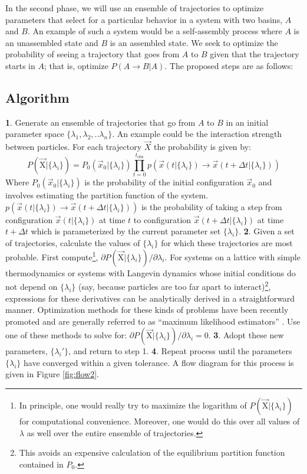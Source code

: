 \documentclass[11pt]{article}
\begin{document}
In the second phase, we will use an ensemble of trajectories to optimize parameters that select for a particular behavior in a system with two basins, $A$ and $B$.  An example of such a system would be a self-assembly process where $A$ is an unassembled state and $B$ is an assembled state.  We seek to optimize the probability of seeing a trajectory that goes from $A$ to $B$ given that the trajectory starts in $A$; that is, optimize $P(A\rightarrow B | A)$.  The proposed steps are as follows: 

\subsection*{Algorithm}
\textbf{1}. Generate an ensemble of trajectories that go from $A$ to $B$ in an initial parameter space $\{\lambda_{1}, \lambda_{2}, .. \lambda_{n}\}$.  An example could be the interaction strength between particles.  For each trajectory $\vec{X}$ the probability is given by:
$$P (\mathrm{\vec{X}}|\{\lambda_{i}\})= P_{0}(\vec{x}_{0}|\{\lambda_{i}\}) \prod_{t=0}^{t_{\mathrm{obs}}} p\left(\vec{x}(t |\{\lambda_{i}\}) \rightarrow \vec{x}(t+\Delta t | \{\lambda_{i}\})\right) $$
Where $P_{0}(\vec{x}_{0}|\{\lambda_{i}\})$ is the probability of the initial configuration $\vec{x}_0$ and involves estimating the partition function of the system.  $p\left(\vec{x}(t| \{\lambda_{i}\}) \rightarrow \vec{x}(t+\Delta t|\{\lambda_{i}\})\right)$ is the probability of taking a step from configuration $\vec{x}(t| \{\lambda_{i}\})$ at time $t$ to configuration $\vec{x}(t+\Delta t| \{\lambda_{i}\})$ at time $t+\Delta t$ which is parameterized by the current parameter set $\{\lambda_{i}\}$.
\textbf{2}. Given a set of trajectories, calculate the values of $\{\lambda_{i}\}$ for which these trajectories are most probable. First compute\footnote{In principle, one would really try to maximize the logarithm of $P (\mathrm{\vec{X}}|\{\lambda_{i}\}) $ for computational convenience.  Moreover, one would do this over all values of $\lambda$ as well over the entire ensemble of trajectories.}, $\partial P (\mathrm{\vec{X}}|\{\lambda_{i}\})/\partial \lambda_{i}$.
For systems on a lattice with simple thermodynamics or systems with Langevin dynamics \cite{IMSM} whose initial conditions do not depend on $\{\lambda_{i}\}$ (say, because particles are too far apart to interact)\footnote{This avoids an expensive calculation of the equilibrium partition function contained in $P_{0}$.}, expressions for these derivatives can be analytically derived in a straightforward manner.    
Optimization methods for these kinds of problems have been recently promoted and are generally referred to as ``maximum likelihood estimators'' \cite{Crooks2007, Shirts2008, Minh2009}.  Use one of these methods to solve for: $\partial P (\mathrm{\vec{X}}|\{\lambda_{i}\})/\partial \lambda_{i} = 0$.
\textbf{3}. Adopt these new parameters, $\{\lambda_{i}'\}$, and return to step 1.
\textbf{4}. Repeat process until the parameters $\{\lambda_i\}$ have converged within a given tolerance.  A flow diagram for this process is given in Figure \ref{fig:flow2}.
\end{document}
